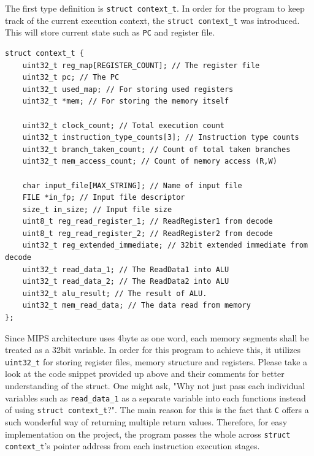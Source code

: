 \documentclass{homework}
\begin{document}
The first type definition is \texttt{struct context_t}. In order for the program to keep track of the current execution context, the \texttt{struct context_t} was introduced. This will store current state such as \texttt{PC} and register file. 
\\
\begin{center}
\begin{code}
\begin{verbatim}
struct context_t {
    uint32_t reg_map[REGISTER_COUNT]; // The register file
    uint32_t pc; // The PC
    uint32_t used_map; // For storing used registers
    uint32_t *mem; // For storing the memory itself

    uint32_t clock_count; // Total execution count
    uint32_t instruction_type_counts[3]; // Instruction type counts
    uint32_t branch_taken_count; // Count of total taken branches
    uint32_t mem_access_count; // Count of memory access (R,W)

    char input_file[MAX_STRING]; // Name of input file
    FILE *in_fp; // Input file descriptor
    size_t in_size; // Input file size
    uint8_t reg_read_register_1; // ReadRegister1 from decode
    uint8_t reg_read_register_2; // ReadRegister2 from decode
    uint32_t reg_extended_immediate; // 32bit extended immediate from decode
    uint32_t read_data_1; // The ReadData1 into ALU
    uint32_t read_data_2; // The ReadData2 into ALU
    uint32_t alu_result; // The result of ALU.
    uint32_t mem_read_data; // The data read from memory
};
\end{verbatim}
\end{code}
\end{center}

Since MIPS architecture uses 4byte as one word, each memory segments shall be treated as a 32bit variable. In order for this program to achieve this, it utilizes \texttt{uint32_t} for storing register files, memory structure and registers. Please take a look at the code snippet provided up above and their comments for better understanding of the struct. One might ask, "Why not just pass each individual variables such as \texttt{read_data_1} as a separate variable into each functions instead of using \texttt{struct context_t}?". The main reason for this is the fact that \texttt{C} offers a such wonderful way of returning multiple return values. Therefore, for easy implementation on the project, the program passes the whole across \texttt{struct context_t}'s pointer address from each instruction execution stages. 
\end{document}
